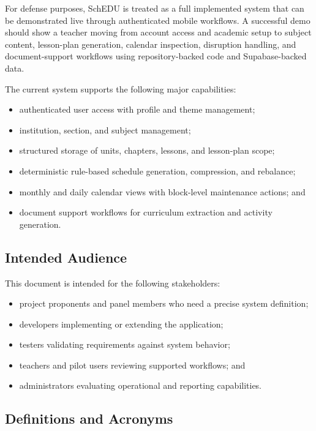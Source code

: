 \documentclass[12pt]{article}
\begin{document}
For defense purposes, SchEDU is treated as a full implemented system that can be
demonstrated live through authenticated mobile workflows. A successful demo
should show a teacher moving from account access and academic setup to subject
content, lesson-plan generation, calendar inspection, disruption handling, and
document-support workflows using repository-backed code and Supabase-backed data.

The current system supports the following major capabilities:
\begin{itemize}
\item authenticated user access with profile and theme management;
\item institution, section, and subject management;
\item structured storage of units, chapters, lessons, and lesson-plan scope;
\item deterministic rule-based schedule generation, compression, and rebalance;
\item monthly and daily calendar views with block-level maintenance actions; and
\item document support workflows for curriculum extraction and activity generation.
\end{itemize}

\subsection{Intended Audience}

This document is intended for the following stakeholders:
\begin{itemize}
\item project proponents and panel members who need a precise system definition;
\item developers implementing or extending the application;
\item testers validating requirements against system behavior;
\item teachers and pilot users reviewing supported workflows; and
\item administrators evaluating operational and reporting capabilities.
\end{itemize}

\subsection{Definitions and Acronyms}
\end{document}
